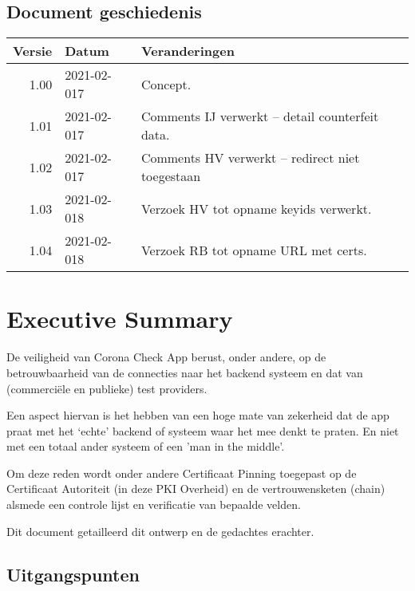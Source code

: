 \documentclass[11.0pt,twoside,openright]{report}
\begin{document}

\maketitle

\section*{Document geschiedenis}

\begin{tabular}{|r|l|l|}
\hline
Versie & Datum & Veranderingen \\
\hline
\hline
1.00 & 2021-02-017 & Concept. \\
\hline
1.01 & 2021-02-017 & Comments IJ verwerkt -- detail counterfeit data.\\
\hline
1.02 & 2021-02-017 & Comments HV verwerkt -- redirect niet toegestaan \\
\hline
1.03 & 2021-02-018 & Verzoek HV tot opname keyids verwerkt.  \\
\hline
1.04 & 2021-02-018 & Verzoek RB tot opname URL met certs.  \\
\hline
\end{tabular}


\pagebreak
\chapter{Executive Summary}

De veiligheid van Corona Check App berust, onder andere, op de betrouwbaarheid van de connecties naar het backend systeem en dat van (commerciële en publieke) test providers.

Een aspect hiervan is het hebben van een hoge mate van zekerheid dat de app praat met het `echte' backend of systeem waar het mee denkt te praten. En niet met een totaal ander systeem of een 'man in the middle'.

Om deze reden wordt onder andere Certificaat Pinning toegepast op de Certificaat Autoriteit (in deze PKI Overheid) en de vertrouwensketen (chain) alsmede een controle lijst en verificatie van bepaalde velden.

Dit document getailleerd dit ontwerp en de gedachtes erachter.

\pagebreak
\section*{Uitgangspunten}
\end{document}

